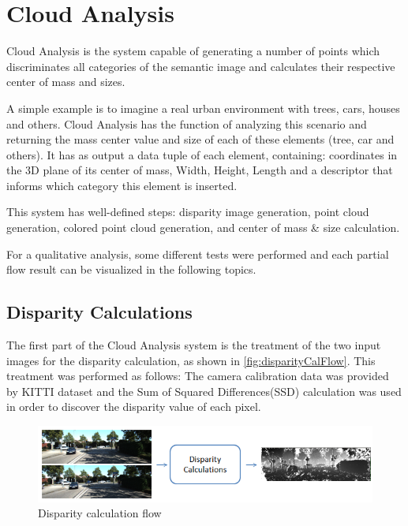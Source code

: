 \section{Cloud Analysis}

    Cloud Analysis is the system capable of generating a number of points which discriminates all categories of the semantic image and calculates their respective center of mass and sizes.
    
    A simple example is to imagine a real urban environment with trees, cars, houses and others. Cloud Analysis has the function of analyzing this scenario and returning the mass center value and size of each of these elements (tree, car and others). It has as output a data tuple of each element, containing: coordinates in the 3D plane of its center of mass, Width, Height, Length and a descriptor that informs which category this element is inserted.

    This system has well-defined steps: disparity image generation, point cloud generation, colored point cloud generation, and center of mass \& size calculation.
    
    For a qualitative analysis, some different tests were performed and each partial flow result can be visualized in the following topics.
    
\subsection{Disparity Calculations}

    The first part of the Cloud Analysis system is the treatment of the two input images for the disparity calculation, as shown in \autoref{fig:disparityCalFlow}. This treatment was performed as follows: The camera calibration data was provided by KITTI dataset and the Sum of Squared Differences(SSD) calculation was used in order to discover the disparity value of each pixel.

    \begin{figure}[H]
        \caption{
        \label{fig:disparityCalFlow}
            Disparity calculation flow}
        \begin{center}
        \includegraphics[width=1\textwidth]{images/disparityCalFlow.png}
        \end{center}
    \end{figure}
    
